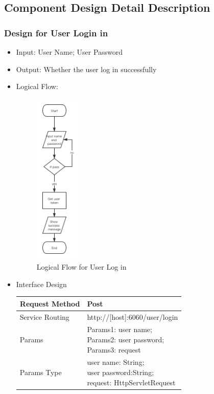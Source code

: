 \documentclass[16pt]{scrreprt}
\begin{document}
\subsection{Component Design Detail Description}
\subsubsection{Design for User Login in}
\begin{itemize}
    \item Input: User Name; User Password
    \item Output: Whether the user log in successfully
    \item Logical Flow:
     \begin{figure}[H]
    \centering
    \includegraphics[width=0.2\textwidth]{diagrams/login.png}
    \caption{Logical Flow for User Log in}
\end{figure}
    \item Interface Design
    \begin{center}
    \begin{tabular}{p{5cm}p{10cm}}
        \hline
        Request Method & Post\\
        \hline
        Service Routing &  http://[host]:6060/user/login\\
        \hline
        Params & \makecell[l]{Params1: user name;\\ Params2: user password;\\ Params3: request}\\ 
        \hline
        Params Type & \makecell[l]{user name: String;\\user password:String;\\ request: HttpServletRequest}\\

\end{tabular}
\end{center}
\end{itemize}
\end{document}

